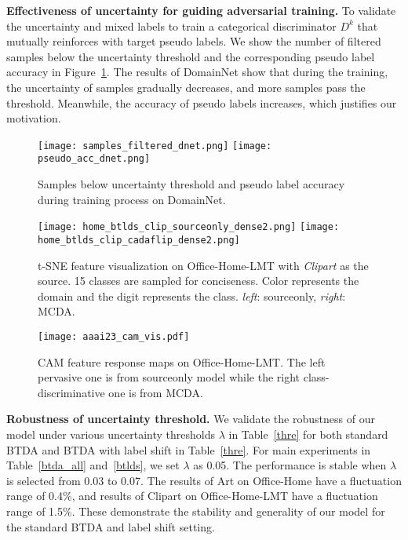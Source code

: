\documentclass[letterpaper]{article} \usepackage{aaai23}  \usepackage{times}  \usepackage{helvet}  \usepackage{courier}  \usepackage[hyphens]{url}  \usepackage{graphicx} \urlstyle{rm} \def\UrlFont{\rm}  \usepackage{natbib}  \usepackage{caption} \frenchspacing  \setlength{\pdfpagewidth}{8.5in}  \setlength{\pdfpageheight}{11in}
\begin{document}
\noindent\textbf{Effectiveness of uncertainty for guiding adversarial training.} To validate the uncertainty and mixed labels to train a categorical discriminator $D^k$ that mutually reinforces with target pseudo labels. We show the number of filtered samples below the uncertainty threshold and the corresponding pseudo label accuracy in Figure~\ref{pse_acc}. The results of DomainNet show that during the training, the uncertainty of samples gradually decreases, and more samples pass the threshold. Meanwhile, the accuracy of pseudo labels increases, which justifies our motivation.



\begin{figure}[t]
\centering
    \label{fig:subfig:sourceonly_tsne} 
    \texttt{[image: samples\_filtered\_dnet.png]}
    \label{fig:subfig:mcda_tsne} 
    \texttt{[image: pseudo\_acc\_dnet.png]}
    

\caption{Samples below uncertainty threshold and pseudo label accuracy during training process on DomainNet.} 
\label{pse_acc}
\end{figure}



\begin{figure}[t]
\centering

\label{fig:subfig:onefunction} 
\texttt{[image: home\_btlds\_clip\_sourceonly\_dense2.png]}
\label{fig:subfig:twofunction} 
\texttt{[image: home\_btlds\_clip\_cadaflip\_dense2.png]}


\caption{t-SNE feature visualization on Office-Home-LMT with \textit{Clipart} as the source. 15 classes are sampled for conciseness. Color represents the domain and the digit represents the class. \textit{left}: sourceonly, \textit{right}: MCDA.} 
\label{t-sne}
\end{figure}




\begin{figure}[t]
\centering

\texttt{[image: aaai23\_cam\_vis.pdf]}

\caption{CAM feature response maps on Office-Home-LMT. The left pervasive one is from sourceonly model while the right class-discriminative one is from MCDA.}
\label{cam} 
\end{figure}






\noindent\textbf{Robustness of uncertainty threshold.} We validate the robustness of our model under various uncertainty thresholds $\lambda$ in Table~\ref{thre} for both standard BTDA and BTDA with label shift in Table~\ref{thre}. For main experiments in Table~\ref{btda_all} and~\ref{btlds}, we set $\lambda$ as 0.05. The performance is stable when $\lambda$ is selected from 0.03 to 0.07. The results of Art on Office-Home have a fluctuation range of 0.4\%, and results of Clipart on Office-Home-LMT have a fluctuation range of 1.5\%. These demonstrate the stability and generality of our model for the standard BTDA and label shift setting.
\end{document}
